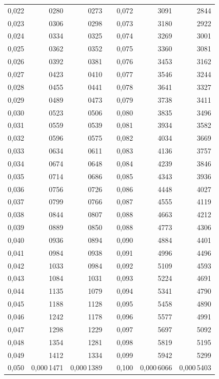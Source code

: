 \begin{tabular}{|r|r|r|@{}p{9pt}@{}|r|r|r|}
0,022 & 0280 & 0273 &  & 0,072 & 3091 & 2844 \\
0,023 & 0306 & 0298 &  & 0,073 & 3180 & 2922 \\
0,024 & 0334 & 0325 &  & 0,074 & 3269 & 3001 \\
0,025 & 0362 & 0352 &  & 0,075 & 3360 & 3081 \\[3pt]
0,026 & 0392 & 0381 &  & 0,076 & 3453 & 3162 \\
0,027 & 0423 & 0410 &  & 0,077 & 3546 & 3244 \\
0,028 & 0455 & 0441 &  & 0,078 & 3641 & 3327 \\
0,029 & 0489 & 0473 &  & 0,079 & 3738 & 3411 \\
0,030 & 0523 & 0506 &  & 0,080 & 3835 & 3496 \\[3pt]
0,031 & 0559 & 0539 &  & 0,081 & 3934 & 3582 \\
0,032 & 0596 & 0575 &  & 0,082 & 4034 & 3669 \\
0,033 & 0634 & 0611 &  & 0,083 & 4136 & 3757 \\
0,034 & 0674 & 0648 &  & 0,084 & 4239 & 3846 \\
0,035 & 0714 & 0686 &  & 0,085 & 4343 & 3936 \\[3pt]
0,036 & 0756 & 0726 &  & 0,086 & 4448 & 4027 \\
0,037 & 0799 & 0766 &  & 0,087 & 4555 & 4119 \\
0,038 & 0844 & 0807 &  & 0,088 & 4663 & 4212 \\
0,039 & 0889 & 0850 &  & 0,088 & 4773 & 4306 \\
0,040 & 0936 & 0894 &  & 0,090 & 4884 & 4401 \\[3pt]
0,041 & 0984 & 0938 &  & 0,091 & 4996 & 4496 \\
0,042 & 1033 & 0984 &  & 0,092 & 5109 & 4593 \\
0,043 & 1084 & 1031 &  & 0,093 & 5224 & 4691 \\
0,044 & 1135 & 1079 &  & 0,094 & 5341 & 4790 \\
0,045 & 1188 & 1128 &  & 0,095 & 5458 & 4890 \\[3pt]
0,046 & 1242 & 1178 &  & 0,096 & 5577 & 4991 \\
0,047 & 1298 & 1229 &  & 0,097 & 5697 & 5092 \\
0,048 & 1354 & 1281 &  & 0,098 & 5819 & 5195 \\
0,049 & 1412 & 1334 &  & 0,099 & 5942 & 5299 \\
0,050 & 0,000\,1471 & 0,000\,1389 &  & 0,100 & 0,000\,6066 & 0,000\,5403 \\
\hline
\end{tabular}\par
